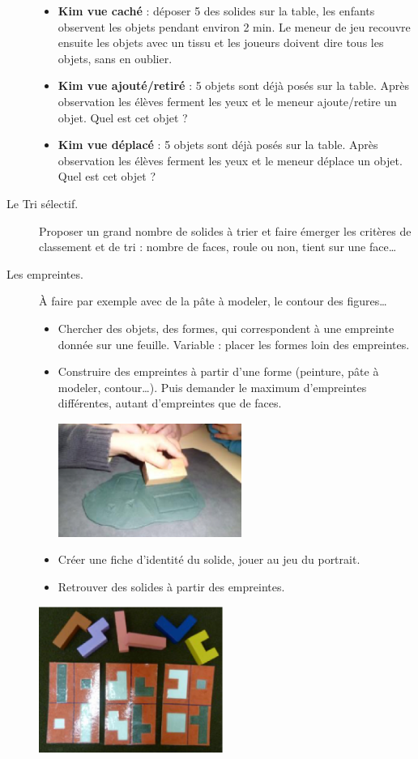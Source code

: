 \begin{exercice*}
\begin{description}
\begin{itemize}
         \item {\bf Kim vue caché} : déposer 5 des solides sur la table, les enfants observent les objets pendant environ 2 min. Le meneur de jeu recouvre ensuite les objets avec un tissu et les joueurs doivent dire tous les objets, sans en oublier.
         \item {\bf Kim vue ajouté/retiré} : 5 objets sont déjà posés sur la table. Après observation les élèves ferment les yeux et le meneur  ajoute/retire un objet. Quel est cet objet ?
         \item {\bf Kim vue déplacé} : 5 objets sont déjà posés sur la table. Après observation les élèves ferment les yeux et le meneur   déplace un objet. Quel est cet objet ?
      \end{itemize}
   \item[Le Tri sélectif.] Proposer un grand nombre de solides à trier et faire émerger les critères de classement et de tri : nombre de faces, roule ou non, tient sur une face\dots
   \item[Les empreintes.]À faire par exemple avec de la pâte à modeler, le contour des figures\dots
      \begin{itemize}
         \item Chercher des objets, des formes, qui correspondent à une empreinte donnée sur une feuille. Variable : placer les formes loin des empreintes.
         \item Construire des empreintes à partir d’une forme (peinture, pâte à modeler, contour\dots). Puis demander le maximum d’empreintes différentes, autant d’empreintes que de faces.
         \begin{center}
            \includegraphics[width=6cm]{Geometrie_did/Images/Geo6_activites_empreinte1}
         \end{center}
         \item Créer une fiche d’identité du solide, jouer au jeu du portrait.
         \item Retrouver des solides à partir des empreintes.
      \end{itemize}
      \begin{center}
         \includegraphics[width=6cm]{Geometrie_did/Images/Geo6_activites_empreinte2}

\end{center}
\end{description}
\end{exercice*}
